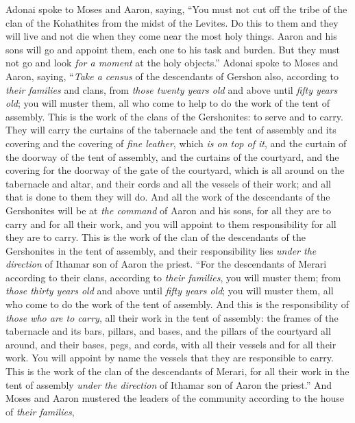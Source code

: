 \begin{biblechapter}
\verse Adonai spoke to Moses and Aaron, saying,
\verse “You must not cut off the tribe of the clan of the Kohathites from the midst of the Levites.
\verse Do this to them and they will live and not die when they come near the most holy things. Aaron and his sons will go and appoint them, each one to his task and burden.
\verse But they must not go and look \textit{for a moment} at the holy objects.”
\verse Adonai spoke to Moses and Aaron, saying,
\verse “\textit{Take a census} of the descendants of Gershon also, according to \textit{their families} and clans,
\verse from \textit{those twenty years old} and above until \textit{fifty years old}; you will muster them, all who come to help to do the work of the tent of assembly.
\verse This is the work of the clans of the Gershonites: to serve and to carry.
\verse They will carry the curtains of the tabernacle and the tent of assembly and its covering and the covering of \textit{fine leather}, which \textit{is on top of it}, and the curtain of the doorway of the tent of assembly,
\verse and the curtains of the courtyard, and the covering for the doorway of the gate of the courtyard, which is all around on the tabernacle and altar, and their cords and all the vessels of their work; and all that is done to them they will do.
\verse And all the work of the descendants of the Gershonites will be at \textit{the command} of Aaron and his sons, for all they are to carry and for all their work, and you will appoint to them responsibility for all they are to carry.
\verse This is the work of the clan of the descendants of the Gershonites in the tent of assembly, and their responsibility lies \textit{under the direction} of Ithamar son of Aaron the priest.
\verse “For the descendants of Merari according to their clans, according to \textit{their families}, you will muster them;
\verse from \textit{those thirty years old} and above until \textit{fifty years old}; you will muster them, all who come to do the work of the tent of assembly.
\verse And this is the responsibility of \textit{those who are to carry}, all their work in the tent of assembly: the frames of the tabernacle and its bars, pillars, and bases,
\verse and the pillars of the courtyard all around, and their bases, pegs, and cords, with all their vessels and for all their work. You will appoint by name the vessels that they are responsible to carry.
\verse This is the work of the clan of the descendants of Merari, for all their work in the tent of assembly \textit{under the direction} of Ithamar son of Aaron the priest.”
\verse And Moses and Aaron mustered the leaders of the community according to the house of \textit{their families},

\end{biblechapter}
